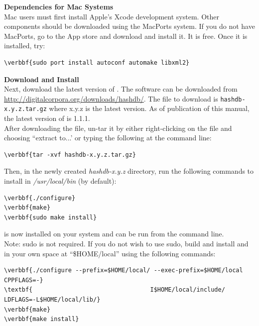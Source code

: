 \documentclass[11pt,fleqn]{article} %
\begin{document}
\textbf{Dependencies for Mac Systems}\\
Mac users must first install Apple's Xcode development system. Other components should be downloaded using the MacPorts system. If you do not have MacPorts, go to the App store and download and install it. It is free. Once it is installed, try:
\begin{Verbatim}[commandchars=\\\{\}]
\verbbf{sudo port install autoconf automake libxml2} 
\end{Verbatim}

\textbf{Download and Install \hdb}\\
Next, download the latest version of \hdb. The software can be downloaded from \url{http://digitalcorpora.org/downloads/hashdb/}. The file to download is \texttt{hashdb-x.y.z.tar.gz} where x.y.z is the latest version. As of publication of this manual, the latest version of \hdb is 1.1.1.\\


After downloading the file, un-tar it by either right-clicking on the file and choosing ``extract to...' or typing the following at the command line:
\begin{Verbatim}[commandchars=\\\{\}]
\verbbf{tar -xvf hashdb-x.y.z.tar.gz}
\end{Verbatim}

Then, in the newly created \textit{hashdb-x.y.z} directory, run the following commands to install \hdb in \textit{/usr/local/bin} (by default):

\begin{Verbatim}[commandchars=\\\{\}]
\verbbf{./configure}
\verbbf{make}
\verbbf{sudo make install}
\end{Verbatim}
\hdb is now installed on your system and can be run from the command line. \\

Note: sudo is not required. If you do not wish to use sudo,  build and install \hdb and \bulk in your own space at ``\$HOME/local'' using the following commands:
\begin{Verbatim}[commandchars=\\\{\}]
\verbbf{./configure --prefix=$HOME/local/ --exec-prefix=$HOME/local CPPFLAGS=-}
\textbf{                                 I$HOME/local/include/ LDFLAGS=-L$HOME/local/lib/}
\verbbf{make}
\verbbf{make install}
\end{Verbatim}
\end{document}

